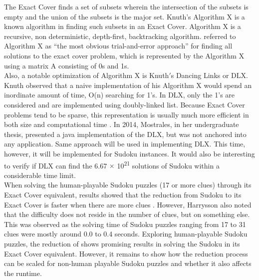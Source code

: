 \documentclass[a4paper,oneside,11pt]{report}
\begin{document}
The Exact Cover finds a set of subsets wherein the intersection of the subsets is empty and the union of the subsets is the major set. Knuth$’$s Algorithm X is a known algorithm in finding such subsets in an Exact Cover. Algorithm X is a recursive, non deterministic, depth-first, backtracking algorithm. \cite{Knuth} referred to Algorithm X as “the most obvious trial-and-error approach” for finding all solutions to the exact cover problem, which is represented by the Algorithm X using  a matrix A consisting of 0s and 1s.\\

Also, a notable optimization of Algorithm X is Knuth$'$s Dancing Links or DLX. Knuth observed that a naive implementation of his Algorithm X would spend an inordinate amount of time, O(n) searching for 1’s. In DLX, only the 1’s are considered and are implemented using doubly-linked list. Because Exact Cover problems tend to be sparse, this representation is usually much more efficient in both size and computational time \cite{Dahlke}. In 2014, Mostrales, in her undergraduate thesis, presented a java implementation of the DLX, but was not anchored into any application. Same approach will be used in implementing DLX. This time, however, it will be implemented for Sudoku instances. It would also be interesting to verify if DLX can find the 6.67 $\times$ 10\textsuperscript{21} solutions of Sudoku within a considerable time limit.\\

When solving the human-playable Sudoku puzzles (17 or more clues) through its Exact Cover equivalent, results showed that the reduction from Sudoku to its Exact Cover is faster when there are more clues \cite{Harrysson}. However, Harrysson also noted that the difficulty does not reside in the number of clues, but on something else. This was observed as the solving time of Sudoku puzzles ranging from 17 to 31 clues were mostly around 0.0 to 0.4 seconds. Exploring human-playable Sudoku puzzles, the reduction of \cite{Harrysson} shows promising results in solving the Sudoku in its Exact Cover equivalent. However, it remains to show how the reduction process can be scaled for non-human playable Sudoku puzzles and whether it also affects the runtime.\\

\begin{figure}[h]
  \centering
  \caption{}
\end{figure}
\end{document}
